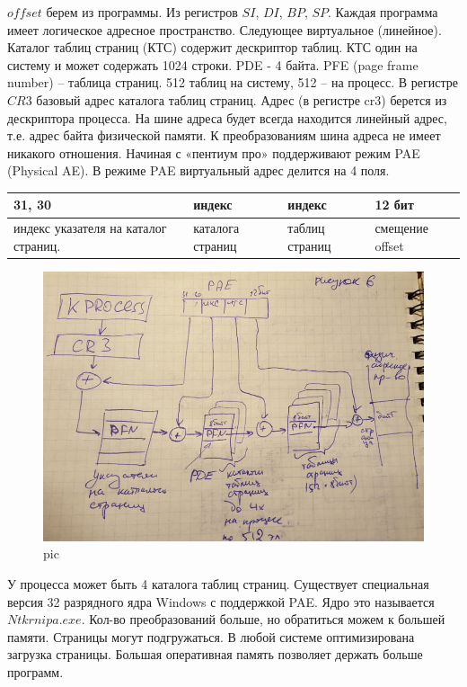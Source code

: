 $offset$ берем из программы. Из регистров $SI$, $DI$, $BP$, $SP$.
Каждая программа имеет логическое адресное пространство. Следующее виртуальное (линейное).
Каталог таблиц страниц (КТС) содержит дескриптор таблиц. КТС один на систему и может содержать 1024 строки.
PDE - 4 байта.
PFE (page frame number) – таблица страниц. 512 таблиц на систему, 512 – на процесс. В регистре $CR3$ базовый адрес каталога таблиц страниц. Адрес (в регистре cr3) берется из дескриптора процесса.
На шине адреса будет всегда находится линейный адрес, т.е. адрес байта физической памяти. К преобразованиям шина адреса не имеет никакого отношения. 
Начиная с «пентиум про» поддерживают режим PAE (Physical AE). 
В режиме PAE виртуальный адрес делится на 4 поля.

\begin{table}[H]
\begin{tabular}{|l|l|l|l|}
\hline
31, 30 & индекс & индекс & 12 бит\\
\hline
индекс указателя на каталог страниц. & каталога страниц & таблиц страниц & смещение offset\\
\hline
\end{tabular}
\end{table}

\begin{figure}[H]
    \centering
    \includegraphics[width=\textwidth]{pic/6.png}
    \caption{pic}
\end{figure}

У процесса может быть 4 каталога таблиц страниц.
Существует специальная версия 32 разрядного ядра Windows с поддержкой PAE. Ядро это называется $Ntkrnipa.exe$. Кол-во преобразований больше, но обратиться можем к большей памяти. Страницы могут подгружаться. В любой системе оптимизирована загрузка страницы. Большая оперативная память позволяет держать больше программ.
